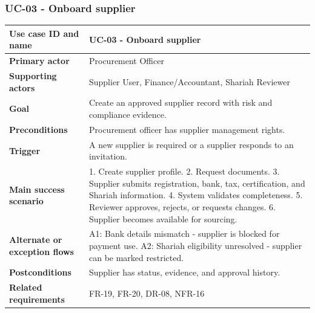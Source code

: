 \documentclass[11pt,a4paper]{article}
\begin{document}
\subsubsection{UC-03 - Onboard supplier}
\begin{footnotesize}
\begin{longtable}{@{}p{}p{}@{}}
\rowcolor{gray!10}\textbf{Use case ID and name} & UC-03 - Onboard supplier \\ \hline
\rowcolor{gray!10}\textbf{Primary actor} & Procurement Officer \\ \hline
\rowcolor{gray!10}\textbf{Supporting actors} & Supplier User, Finance/Accountant, Shariah Reviewer \\ \hline
\rowcolor{gray!10}\textbf{Goal} & Create an approved supplier record with risk and compliance evidence. \\ \hline
\rowcolor{gray!10}\textbf{Preconditions} & Procurement officer has supplier management rights. \\ \hline
\rowcolor{gray!10}\textbf{Trigger} & A new supplier is required or a supplier responds to an invitation. \\ \hline
\rowcolor{gray!10}\textbf{Main success scenario} & 1. Create supplier profile. 2. Request documents. 3. Supplier submits registration, bank, tax, certification, and Shariah information. 4. System validates completeness. 5. Reviewer approves, rejects, or requests changes. 6. Supplier becomes available for sourcing. \\ \hline
\rowcolor{gray!10}\textbf{Alternate or exception flows} & A1: Bank details mismatch - supplier is blocked for payment use. A2: Shariah eligibility unresolved - supplier can be marked restricted. \\ \hline
\rowcolor{gray!10}\textbf{Postconditions} & Supplier has status, evidence, and approval history. \\ \hline
\rowcolor{gray!10}\textbf{Related requirements} & FR-19, FR-20, DR-08, NFR-16 \\ \hline
\end{longtable}
\end{footnotesize}
\end{document}
